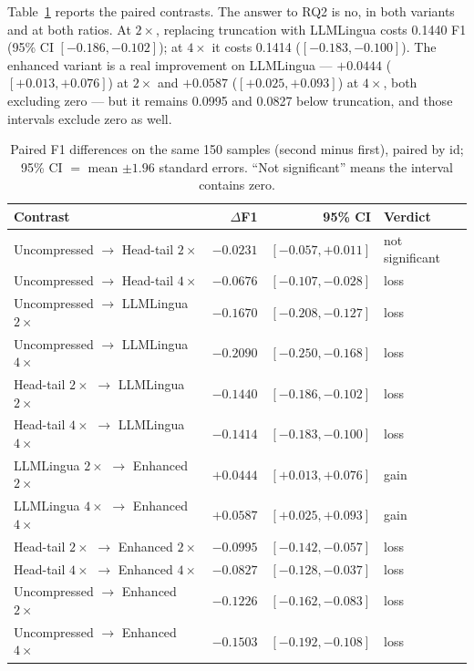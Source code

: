﻿\documentclass[10pt,a4paper,twocolumn]{article}
\begin{document}
Table~\ref{tab:paired} reports the paired contrasts. The answer to RQ2 is no, in
both variants and at both ratios. At $2\times$, replacing truncation with
LLMLingua costs 0.1440 F1 (95\% CI $[-0.186, -0.102]$); at $4\times$ it costs
0.1414 ($[-0.183, -0.100]$). The enhanced variant is a real improvement on
LLMLingua --- $+0.0444$ ($[+0.013, +0.076]$) at $2\times$ and $+0.0587$
($[+0.025, +0.093]$) at $4\times$, both excluding zero --- but it remains 0.0995
and 0.0827 below truncation, and those intervals exclude zero as well.

\begin{table}[t]
\centering
\small
\begin{tabular}{@{}lrrl@{}}
\toprule
Contrast & $\Delta$F1 & 95\% CI & Verdict \\
\midrule
Uncompressed $\rightarrow$ Head-tail $2\times$  & $-0.0231$ & $[-0.057, +0.011]$ & not significant \\
Uncompressed $\rightarrow$ Head-tail $4\times$  & $-0.0676$ & $[-0.107, -0.028]$ & loss \\
Uncompressed $\rightarrow$ LLMLingua $2\times$  & $-0.1670$ & $[-0.208, -0.127]$ & loss \\
Uncompressed $\rightarrow$ LLMLingua $4\times$  & $-0.2090$ & $[-0.250, -0.168]$ & loss \\
Head-tail $2\times$ $\rightarrow$ LLMLingua $2\times$ & $-0.1440$ & $[-0.186, -0.102]$ & loss \\
Head-tail $4\times$ $\rightarrow$ LLMLingua $4\times$ & $-0.1414$ & $[-0.183, -0.100]$ & loss \\
LLMLingua $2\times$ $\rightarrow$ Enhanced $2\times$ & $+0.0444$ & $[+0.013, +0.076]$ & gain \\
LLMLingua $4\times$ $\rightarrow$ Enhanced $4\times$ & $+0.0587$ & $[+0.025, +0.093]$ & gain \\
Head-tail $2\times$ $\rightarrow$ Enhanced $2\times$ & $-0.0995$ & $[-0.142, -0.057]$ & loss \\
Head-tail $4\times$ $\rightarrow$ Enhanced $4\times$ & $-0.0827$ & $[-0.128, -0.037]$ & loss \\
\midrule
Uncompressed $\rightarrow$ Enhanced $2\times$ & $-0.1226$ & $[-0.162, -0.083]$ & loss \\
Uncompressed $\rightarrow$ Enhanced $4\times$ & $-0.1503$ & $[-0.192, -0.108]$ & loss \\
\bottomrule
\end{tabular}
\caption{Paired F1 differences on the same 150 samples (second minus first),
paired by id; 95\% CI $=$ mean $\pm 1.96$ standard errors. ``Not significant''
means the interval contains zero.}
\label{tab:paired}
\end{table}
\end{document}
